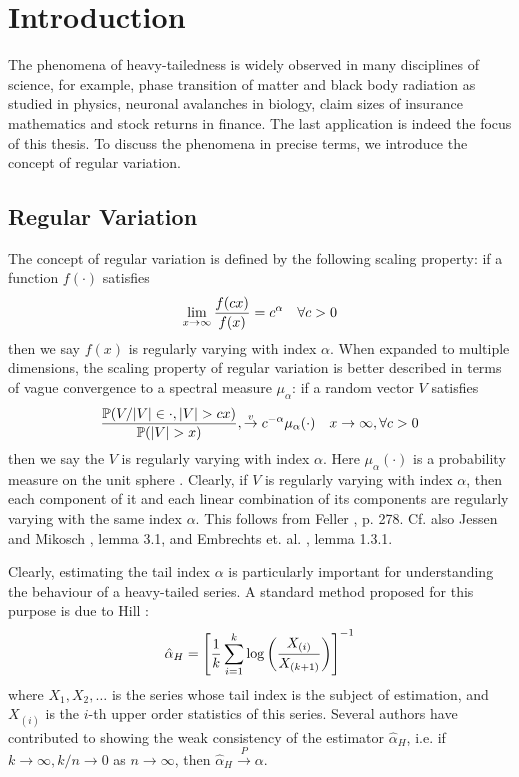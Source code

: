 \chapter{Introduction}\label{ch:intr}
The phenomena of heavy-tailedness is widely observed in many
disciplines of science, for example, phase transition of matter and
black body radiation as studied in physics, neuronal avalanches in
biology, claim sizes of insurance mathematics and stock returns in
finance. The last application is indeed the focus of this thesis. To
discuss the phenomena in precise terms, we introduce the concept of
regular variation.

\section{Regular Variation}
The concept of regular variation is defined by the following scaling
property: if a function $f(\cdot)$ satisfies
\[
\lim_{x \to \infty} {f(c x) \over f(x)} = c^\alpha
\quad
\forall c > 0
\]
then we say $f(x)$ is regularly varying with index $\alpha$.
When expanded to multiple dimensions, the scaling property of regular
variation is better described in terms of vague convergence to a
spectral measure $\mu_\alpha$: if a random vector $V$ satisfies
\[
{
  \P(V/|V| \in \cdot, |V| > c x)
  \over
  \P(|V| > x)
},
\overset{v}{\to} c^{-\alpha} \mu_\alpha(\cdot)
\quad
x \to \infty, \forall c > 0
\]
then we say the $V$ is regularly varying with index $\alpha$. Here
$\mu_\alpha(\cdot)$ is a probability measure on the unit sphere
\cite{buraczewski:damek:mikosch:2016}. Clearly, if $V$
is regularly varying with index $\alpha$, then each component
of it and each linear combination of its components are regularly
varying with the same index $\alpha$. This follows from Feller
\cite{feller}, p. 278. Cf. also Jessen and Mikosch
\cite{JessenMikosch2006}, lemma 3.1, and Embrechts et. al.
\cite{embrechts:klueppelberg:mikosch:1997}, lemma 1.3.1.

Clearly, estimating the tail index $\alpha$ is particularly important
for understanding the behaviour of a heavy-tailed series. A standard
method proposed for this purpose is due to Hill \cite{hill1975simple}:
\[
\hat \alpha_H = \left[
  {1 \over k} \sum_{i=1}^k \log \left(
  X_{(i)} \over X_{(k+1)}
  \right)
  \right]^{-1}
\]
where $X_1, X_2, \dots$ is the series whose tail index is the subject
of estimation, and $X_{(i)}$ is the $i$-th upper order statistics of
this series. Several authors have contributed to showing the
weak consistency of the estimator $\hat \alpha_H$,
i.e. if $k \to \infty, k/n \to 0$ as $n \to \infty$, then
$\hat \alpha_H \overset{P}{\to} \alpha$.


